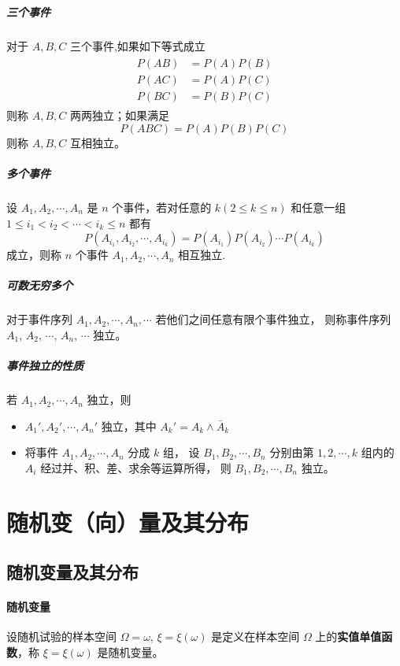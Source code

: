 \subparagraph{三个事件} 对于 $A,B,C$ 三个事件,如果如下等式成立
\begin{align}
    \begin{split}
        P(AB) & = P(A)P(B) \\
        P(AC) & = P(A)P(C) \\
        P(BC) & = P(B)P(C) 
    \end{split}
\end{align}
则称 $A,B,C$ 两两独立；如果满足
\begin{equation}
    P(ABC) = P(A)P(B)P(C)
\end{equation}
则称 $A,B,C$ 互相独立。

\subparagraph{多个事件} 设 $A_1,A_2,\cdots,A_n$ 是 $n$ 个事件，若对任意的 $k(2 \leqslant k \leqslant n)$
和任意一组 $ 1 \leqslant i_1 < i_2 < \cdots < i_k \leqslant n $ 都有
\begin{equation}
    P(A_{i_1}, A_{i_2}, \cdots, A_{i_k}) = P(A_{i_1})P(A_{i_2})\cdots P(A_{i_k})
\end{equation}
成立，则称 $n$ 个事件 $A_1,A_2,\cdots,A_n$ 相互独立.

\subparagraph{可数无穷多个} 对于事件序列 $A_1,A_2,\cdots,A_n,\cdots$ 若他们之间任意有限个事件独立，
则称事件序列 $A_1$, $A_2$, $\cdots$, $A_n$, $\cdots$ 独立。

\subparagraph{事件独立的性质} 若 $A_1,A_2,\cdots,A_n$ 独立，则
\begin{itemize}
    \item $A_1',A_2',\cdots,A_n'$ 独立，其中 $A_k' = A_k \wedge \bar{A}_k $
    \item 将事件 $A_1,A_2,\cdots,A_n$ 分成 $k$ 组，
    设 $B_1,B_2,\cdots,B_n$ 分别由第 $1,2,\cdots,k$ 组内的 $A_i$ 经过并、积、差、求余等运算所得，
    则 $B_1,B_2,\cdots,B_n$ 独立。
\end{itemize}

\section{随机变（向）量及其分布}

\subsection{随机变量及其分布}

\paragraph{随机变量} 设随机试验的样本空间  $ \Omega = {\omega} $, $ \xi = \xi(\omega) $
是定义在样本空间 $ \Omega $ 上的\textbf{实值单值函数}，称 $ \xi = \xi(\omega) $ 是随机变量。

